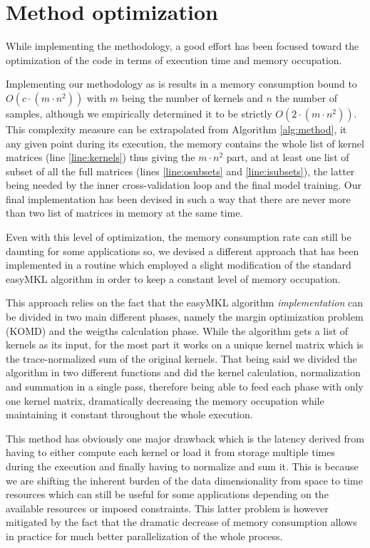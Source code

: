 
\section{Method optimization}
\label{sec:opt}

While implementing the methodology, a good effort has been focused toward the
optimization of the code in terms of execution time and memory occupation.

Implementing our methodology as is results in a memory consumption bound to
$O(c \cdot (m\cdot n^2))$ with $m$ being the number of kernels and $n$ the number of samples,
although we empirically determined it to be strictly $O(2\cdot (m\cdot n^2))$.
This complexity measure can be extrapolated from  Algorithm \ref{alg:method},
it any given point during its execution, the memory contains the whole list
of kernel matrices (line \ref{line:kernels}) thus giving the $m\cdot n^2$ part,
and at least one list of subset of all the full matrices (lines \ref{line:osubsets}
and \ref{line:isubsets}), the latter being needed by the inner cross-validation
loop and the final model training.  Our final implementation has been devised in
such a way that there are never more than two list of matrices in memory at the
same time.  

Even with this level of optimization, the memory consumption rate can still be
daunting for some applications so, we devised a different approach that has been
implemented in a routine which employed a slight modification of the standard
easyMKL algorithm \cite{easymkl} in order to keep a constant level of memory
occupation.

This approach relies on the fact that the easyMKL algorithm \emph{implementation}
can be divided in two main different phases, namely the margin optimization problem
(KOMD) and the weigths calculation phase.
While the algorithm gets a list of kernels as its input, for the most part
it works on a unique kernel matrix which is the trace-normalized sum of the 
original kernels.
That being said we divided the algorithm in two different functions and did
the kernel calculation, normalization and summation in a single pass, therefore
being able to feed each phase with only one kernel matrix, dramatically decreasing
the memory occupation while maintaining it constant throughout the whole execution.

This method has obviously one major drawback which is the latency derived from
having to either compute each kernel or load it from storage multiple times
during the execution and finally having to normalize and sum it.
This is because we are shifting the inherent burden of the data dimensionality
from space to time resources which can still be useful for some applications
depending on the available resources or imposed constraints.
This latter problem is however mitigated by the fact that the dramatic decrease
of memory consumption allows in practice for much better parallelization of the
whole process.

